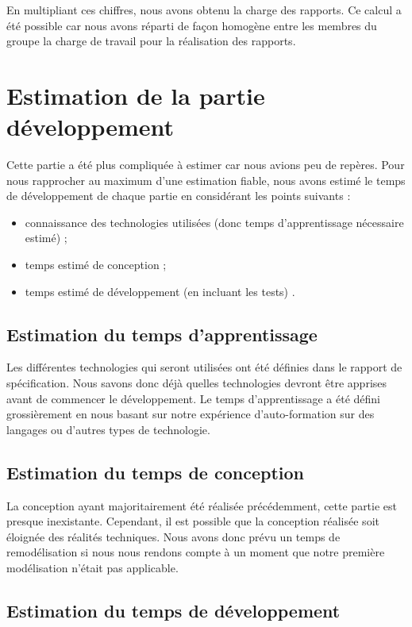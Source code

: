En multipliant ces chiffres, nous avons obtenu la charge des rapports. Ce calcul a été possible car nous avons réparti de façon homogène entre les membres du groupe la charge de travail pour la réalisation des rapports.

\section{Estimation de la partie développement}

Cette partie a été plus compliquée à estimer car nous avions peu de repères. Pour nous rapprocher au maximum d’une estimation fiable, nous avons estimé le temps de développement de chaque partie en considérant les points suivants : 

\begin{itemize}
\item connaissance des technologies utilisées (donc temps d’apprentissage nécessaire estimé) ;
\item temps estimé de conception ;
\item temps estimé de développement (en incluant les tests) .
\end{itemize}

\subsection{Estimation du temps d'apprentissage}

Les différentes technologies qui seront utilisées ont été définies dans le rapport de spécification. Nous savons donc déjà quelles technologies devront être apprises avant de commencer le développement. Le temps d’apprentissage a été défini grossièrement en nous basant sur notre expérience d’auto-formation sur des langages ou d’autres types de technologie.

\newpage

\subsection{Estimation du temps de conception}

La conception ayant majoritairement été réalisée précédemment, cette partie est presque inexistante. Cependant, il est possible que la conception réalisée soit éloignée des réalités techniques. Nous avons donc prévu un temps de remodélisation si nous nous rendons compte à un moment que notre première modélisation n’était pas applicable.

\subsection{Estimation du temps de développement}

